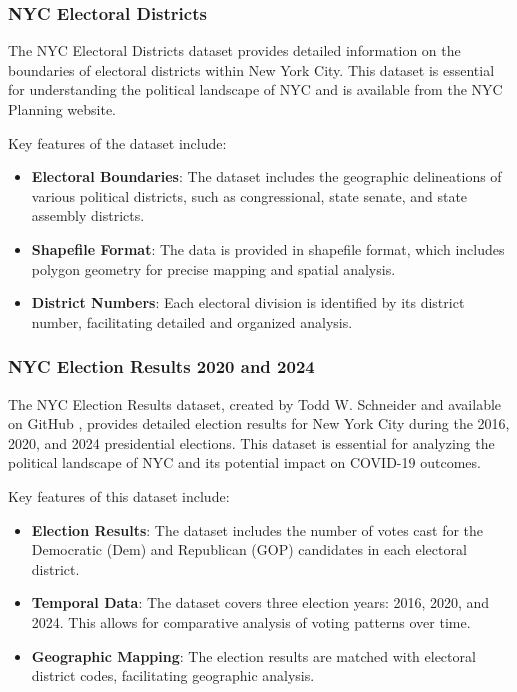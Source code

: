 \documentclass[10pt,journal,compsoc]{IEEEtran}
\begin{document}
\subsubsection{NYC Electoral Districts}

The NYC Electoral Districts dataset \cite{nycelectoraldistricts} provides detailed information on the boundaries of electoral districts within New York City. This dataset is essential for understanding the political landscape of NYC and is available from the NYC Planning website.

Key features of the dataset include:
\begin{itemize}
    \item \textbf{Electoral Boundaries}: The dataset includes the geographic delineations of various political districts, such as congressional, state senate, and state assembly districts.
    \item \textbf{Shapefile Format}: The data is provided in shapefile format, which includes polygon geometry for precise mapping and spatial analysis.
    \item \textbf{District Numbers}: Each electoral division is identified by its district number, facilitating detailed and organized analysis.
\end{itemize}

\subsubsection{NYC Election Results 2020 and 2024}

The NYC Election Results dataset, created by Todd W. Schneider and available on GitHub \cite{nycelectionmap}, provides detailed election results for New York City during the 2016, 2020, and 2024 presidential elections. This dataset is essential for analyzing the political landscape of NYC and its potential impact on COVID-19 outcomes.

Key features of this dataset include:
\begin{itemize}
    \item \textbf{Election Results}: The dataset includes the number of votes cast for the Democratic (Dem) and Republican (GOP) candidates in each electoral district.
    \item \textbf{Temporal Data}: The dataset covers three election years: 2016, 2020, and 2024. This allows for comparative analysis of voting patterns over time.
    \item \textbf{Geographic Mapping}: The election results are matched with electoral district codes, facilitating geographic analysis.
\end{itemize}
\end{document}
